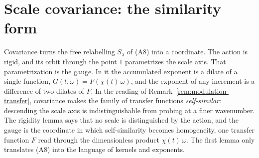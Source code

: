 %

\section{Scale covariance: the similarity form}\label{sec:covariance}

Covariance turns the free relabelling $S_\lambda$ of (A8) into a coordinate. The action is
rigid, and its orbit through the point $1$ parametrizes the scale axis. That
parametrization is the gauge. In it the accumulated exponent is a dilate of a single
function, $G(t,\omega) = F(\chi(t)\,\omega)$, and the exponent of any increment is a
difference of two dilates of $F$. In the reading of
Remark~\ref{rem:modulation-transfer}, covariance makes the family of transfer functions
\emph{self-similar}: descending the scale axis is indistinguishable from probing at a finer
wavenumber. The rigidity lemma says that no scale is distinguished by the action, and the
gauge is the coordinate in which self-similarity becomes homogeneity, one transfer function
$F$ read through the dimensionless product $\chi(t)\,\omega$. The first lemma only translates (A8) into the
language of kernels and exponents.

